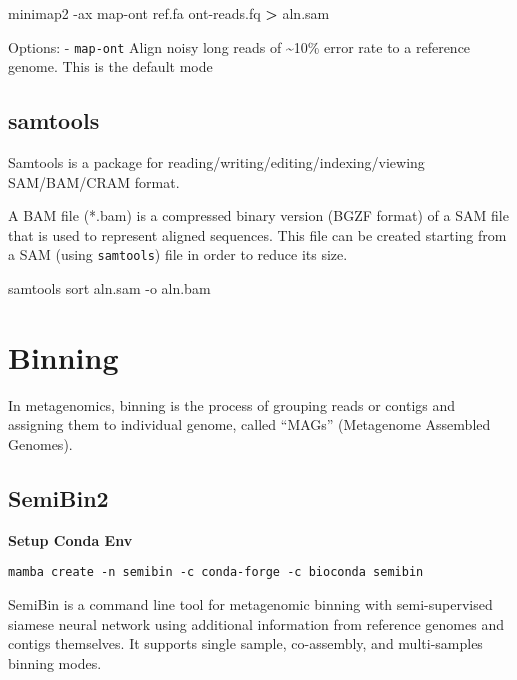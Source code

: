 \documentclass[
]{book}
\newenvironment{Shaded}{\begin{snugshade}}{\end{snugshade}}
\newcommand{\AttributeTok}[1]{\textcolor[rgb]{0.13,0.29,0.53}{#1}}
\newcommand{\ExtensionTok}[1]{#1}
\newcommand{\NormalTok}[1]{#1}
\newcommand{\OperatorTok}[1]{\textcolor[rgb]{0.81,0.36,0.00}{\textbf{#1}}}
\begin{document}
\begin{Shaded}
\begin{Highlighting}[]
\ExtensionTok{minimap2} \AttributeTok{{-}ax}\NormalTok{ map{-}ont ref.fa ont{-}reads.fq }\OperatorTok{\textgreater{}}\NormalTok{ aln.sam}
\end{Highlighting}
\end{Shaded}

Options:
- \texttt{map-ont} Align noisy long reads of \textasciitilde10\% error rate to a reference genome. This is the default mode

\subsection{samtools}\label{samtools}

Samtools is a package for reading/writing/editing/indexing/viewing SAM/BAM/CRAM format.

A BAM file (*.bam) is a compressed binary version (BGZF format) of a SAM file that is used to represent aligned sequences. This file can be created starting from a SAM (using \texttt{samtools}) file in order to reduce its size.

\begin{Shaded}
\begin{Highlighting}[]
\ExtensionTok{samtools}\NormalTok{ sort aln.sam }\AttributeTok{{-}o}\NormalTok{ aln.bam}
\end{Highlighting}
\end{Shaded}

\section{Binning}\label{binning}

In metagenomics, binning is the process of grouping reads or contigs and assigning them to individual genome, called ``MAGs'' (Metagenome Assembled Genomes).

\subsection{SemiBin2}\label{semibin2}

\textbf{Setup Conda Env}

\begin{verbatim}
mamba create -n semibin -c conda-forge -c bioconda semibin
\end{verbatim}

SemiBin is a command line tool for metagenomic binning with semi-supervised siamese neural network using additional information from reference genomes and contigs themselves.
It supports single sample, co-assembly, and multi-samples binning modes.
\end{document}
